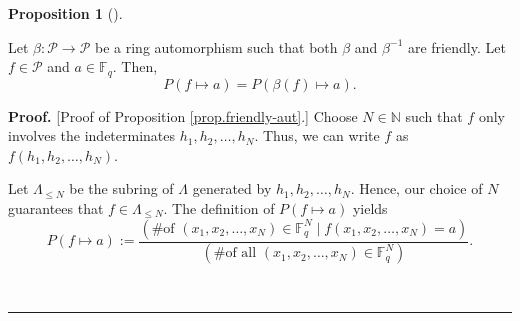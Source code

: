\documentclass[numbers=enddot,12pt,final,onecolumn,notitlepage]{scrartcl}%
\theoremstyle{definition}
\newtheorem{prop}[theo]{Proposition}
\newenvironment{proposition}[1][]
{\begin{prop}[#1]\begin{leftbar}}
{\end{leftbar}\end{prop}}
\newenvironment{proof}[1][Proof]{\noindent\textbf{#1.} }{\ \rule{0.5em}{0.5em}}
\renewcommand{\leq}{\leqslant}
\theoremstyle{plainsl}
\begin{document}
\begin{proposition}
\label{prop.friendly-aut}Let $\beta:\mathcal{P}\rightarrow\mathcal{P}$ be a
ring automorphism such that both $\beta$ and $\beta^{-1}$ are friendly. Let
$f\in\mathcal{P}$ and $a\in\mathbb{F}_{q}$. Then,%
\[
P\left(  f\mapsto a\right)  =P\left(  \beta\left(  f\right)  \mapsto a\right)
.
\]

\end{proposition}

\begin{proof}
[Proof of Proposition \ref{prop.friendly-aut}.] Choose $N\in\mathbb{N}$ such
that $f$ only involves the indeterminates $h_{1},h_{2},\ldots,h_{N}$. Thus, we
can write $f$ as $f\left(  h_{1},h_{2},\ldots,h_{N}\right)  $.

Let $\Lambda_{\leq N}$ be the subring of $\Lambda$ generated by $h_{1}%
,h_{2},\ldots,h_{N}$. Hence, our choice of $N$ guarantees that $f\in
\Lambda_{\leq N}$. The definition of $P\left(  f\mapsto a\right)  $ yields%
\begin{equation}
P\left(  f\mapsto a\right)  :=\dfrac{\left(  \text{\# of }\left(  x_{1}%
,x_{2},\ldots,x_{N}\right)  \in\mathbb{F}_{q}^{N}\mid f\left(  x_{1}%
,x_{2},\ldots,x_{N}\right)  =a\right)  }{\left(  \text{\# of all }\left(
x_{1},x_{2},\ldots,x_{N}\right)  \in\mathbb{F}_{q}^{N}\right)  }%
.\label{pf.prop.friendly-aut.P1}%
\end{equation}



\end{proof}
\end{document}
